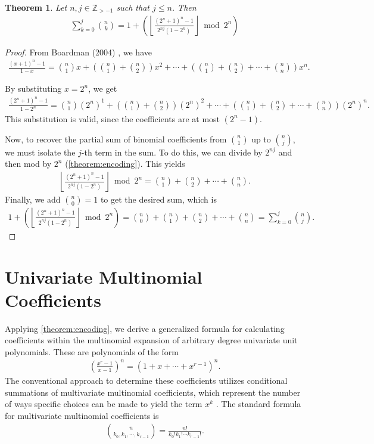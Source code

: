 \documentclass{article}
\theoremstyle{plain}
\newtheorem{theorem}{Theorem}
\theoremstyle{definition}
\newcommand{\floor}[1]{\left\lfloor #1 \right\rfloor}
\newcommand{\Z}{\mathbb{Z}}
\begin{document}
\begin{theorem} \label{proof:binomialcoeffpartialsums2}
Let $n,j \in \Z_{>-1}$ such that $j \leq n$. Then
\begin{align*}
\sum_{k=0}^{j} \binom{n}{k} = 1 + \left( \floor{ \frac{(2^n+1)^n - 1}{2^{nj}(1-2^n)} } \bmod 2^n \right)
\end{align*}
\end{theorem}
\begin{proof}
From Boardman (2004) \cite{boardman2004eggdropnumbers}, we have
\begin{align*}
\frac{(x+1)^n - 1}{1-x} = 
\binom{n}{1} x
+ \left( \binom{n}{1} + \binom{n}{2} \right) x^2
+ \cdots
+ \left( \binom{n}{1} + \binom{n}{2} + \cdots + \binom{n}{n} \right) x^n .
\end{align*}

By substituting $x=2^n$, we get
\begin{align*}
\frac{(2^n+1)^n - 1}{1-2^n} = 
\binom{n}{1} (2^n)^1
+ \left( \binom{n}{1} + \binom{n}{2} \right) (2^n)^2
+ \cdots
+ \left( \binom{n}{1} + \binom{n}{2} + \cdots + \binom{n}{n} \right) (2^n)^n .
\end{align*}
This substitution is valid, since the coefficients are at most $(2^n-1)$.

Now, to recover the partial sum of binomial coefficients from $\binom{n}{1}$ up to $\binom{n}{j}$, we must isolate the $j$-th term in the sum. To do this, we can divide by $2^{nj}$ and then mod by $2^n$ (\cref{theorem:encoding}). This yields
\begin{align*}
\floor{ \frac{(2^n+1)^n - 1}{2^{nj}(1-2^n)} } \bmod 2^n = 
\binom{n}{1} + \binom{n}{2} + \cdots + \binom{n}{n} .
\end{align*}
Finally, we add $\binom{n}{0} = 1$ to get the desired sum, which is
\begin{align*}
1 + \left( \floor{ \frac{(2^n+1)^n - 1}{2^{nj}(1-2^n)} } \bmod 2^n \right) = 
\binom{n}{0} + \binom{n}{1} + \binom{n}{2} + \cdots + \binom{n}{n} = \sum_{k=0}^j \binom{n}{j} .
\end{align*}
\end{proof}

\section{Univariate Multinomial Coefficients} \label{section:multinomialformula}
Applying \cref{theorem:encoding}, we derive a generalized formula for calculating coefficients within the multinomial expansion of arbitrary degree univariate unit polynomials. These are polynomials of the form
\begin{align*}
    \left(\frac{x^{r}-1}{x-1}\right)^n = (1 + x + \cdots + x^{r-1})^n  .
\end{align*}
The conventional approach to determine these coefficients utilizes conditional summations of multivariate multinomial coefficients, which represent the number of ways specific choices can be made to yield the term \(x^k\) \cite{graham1994concrete}. The standard formula for multivariate multinomial coefficients is
\begin{align*}
    \binom{n}{k_0, k_1, \cdots, k_{r-1}} = \frac{n!}{k_0! k_1! \cdots k_{r-1}!} .
\end{align*}
\end{document}
